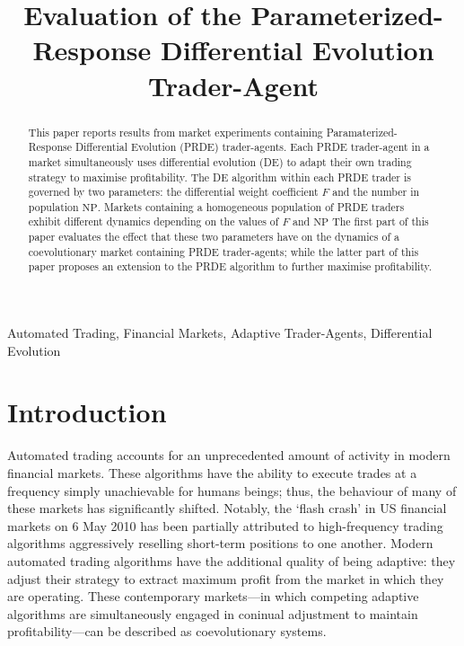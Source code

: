 \documentclass[conference]{IEEEtran}
\begin{document}
\title{Evaluation of the Parameterized-Response Differential Evolution Trader-Agent}

\author{
}

\maketitle

\begin{abstract}
This paper reports results from market experiments containing Paramaterized-Response Differential Evolution (PRDE) trader-agents.
Each PRDE trader-agent in a market simultaneously uses differential evolution (DE) to adapt their own trading strategy to maximise profitability.
The DE algorithm within each PRDE trader is governed by two parameters: the differential weight coefficient $F$ and the number in population $\mathrm{NP}$.
Markets containing a homogeneous population of PRDE traders exhibit different dynamics depending on the values of $F$ and $\mathrm{NP}$
The first part of this paper evaluates the effect that these two parameters have on the dynamics of a coevolutionary market containing PRDE trader-agents; while the latter part of this paper proposes an extension to the PRDE algorithm to further maximise profitability.
\end{abstract}

\begin{IEEEkeywords}
Automated Trading, Financial Markets, Adaptive Trader-Agents, Differential Evolution
\end{IEEEkeywords}

\section{Introduction}

Automated trading accounts for an unprecedented amount of activity in modern financial markets.
These algorithms have the ability to execute trades at a frequency simply unachievable for humans beings; thus, the behaviour of many of these markets has significantly shifted.
Notably, the `flash crash' in US financial markets on 6 May 2010 has been partially attributed to high-frequency trading algorithms aggressively reselling short-term positions to one another.
Modern automated trading algorithms have the additional quality of being adaptive: they adjust their strategy to extract maximum profit from the market in which they are operating.
These contemporary markets---in which competing adaptive algorithms are simultaneously engaged in coninual adjustment to maintain profitability---can be described as coevolutionary systems.
\end{document}
